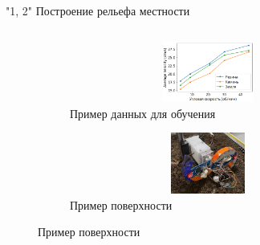\begin{frame}[t]{"1, 2" Построение рельефа местности}
\begin{columns}[T,onlytextwidth]
\begin{column}{0.49\textwidth}
            \vspace{-0.35cm}
            \begin{figure}[H]
                \begin{subfigure}{0.49\textwidth}
                    \centering\includegraphics[height=2cm,width=1\textwidth,keepaspectratio]{../images/slides/avg_lin_vel_rev_min.png}
                    \caption*{Пример данных для обучения}
                \end{subfigure}
                \begin{subfigure}{0.49\textwidth}
                    \centering\includegraphics[height=2cm,width=1\textwidth,keepaspectratio]{../images/slides/data.png}
                    \caption*{Пример поверхности}
                \end{subfigure}
            \end{figure}
        \end{column}
    \end{columns}
\end{frame}


